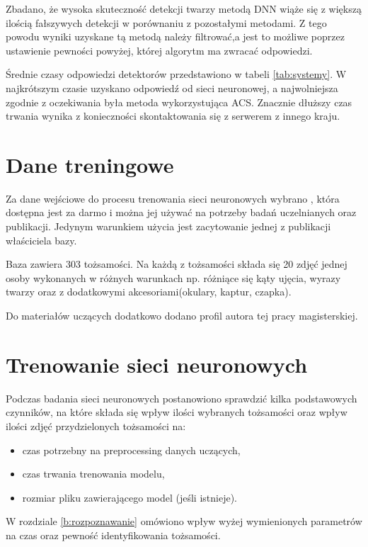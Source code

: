 Zbadano, że wysoka skuteczność detekcji twarzy metodą DNN wiąże się z większą ilością fałszywych detekcji w porównaniu z pozostałymi metodami. Z tego powodu wyniki uzyskane tą metodą należy filtrować,a jest to możliwe poprzez ustawienie pewności powyżej, której algorytm ma zwracać odpowiedzi.

Średnie czasy odpowiedzi detektorów przedstawiono w tabeli \ref{tab:systemy}. W najkrótszym czasie uzyskano odpowiedź od sieci neuronowej, a najwolniejsza zgodnie z oczekiwania była metoda wykorzystująca ACS. Znacznie dłuższy czas trwania wynika z konieczności skontaktowania się z serwerem z innego kraju.

\begin{table}[H]\label{tab:systemy}
	\centering
	\caption{Średni czas przetwarzania zadania detekcji twarzy}
\end{table}

\section{Dane treningowe}
Za dane wejściowe do procesu trenowania sieci neuronowych wybrano , która dostępna jest za darmo i można jej używać na potrzeby badań uczelnianych oraz publikacji. Jedynym warunkiem użycia jest zacytowanie jednej z publikacji właściciela bazy.

Baza zawiera 303 tożsamości. Na każdą z tożsamości składa się 20 zdjęć jednej osoby wykonanych w różnych warunkach np. różniące się kąty ujęcia, wyrazy twarzy oraz z dodatkowymi akcesoriami(okulary, kaptur, czapka). 

Do materiałów uczących dodatkowo dodano profil autora tej pracy magisterskiej.

\section{Trenowanie sieci neuronowych}
Podczas badania sieci neuronowych postanowiono sprawdzić kilka podstawowych czynników, na które składa się wpływ ilości wybranych tożsamości oraz wpływ ilości zdjęć przydzielonych tożsamości na:
\begin{itemize}
\item czas potrzebny na preprocessing danych uczących,
\item czas trwania trenowania modelu,
\item rozmiar pliku zawierającego model (jeśli istnieje).
\end{itemize}
W rozdziale \ref{b:rozpoznawanie} omówiono wpływ wyżej wymienionych parametrów na czas oraz pewność identyfikowania tożsamości.

